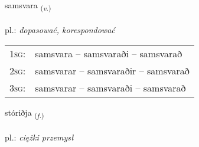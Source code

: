 \documentclass[frontgrid, backgrid]{flacards}\usepackage[]{graphicx}\usepackage[]{xcolor}
\begin{document}
\renewcommand{\flhead}{\vskip5pt \fboxsep=0pt {\small\bfseries\footnotesize Sagnorð | czasownik}}
\renewcommand{\fcfoot}{\vskip5pt \fboxsep=0pt \hspace{2pt}{\small\bfseries\footnotesize 3K}}

\renewcommand{\blhead}{\vskip5pt {\small\bfseries\footnotesize Sagnorð | czasownik }}
\renewcommand{\bcfoot}{\vskip5pt \hspace{2pt}{\small\bfseries\footnotesize 3K}}


{samsvara \small{\textsubscript{(\textit{v.})}} \\[1ex] %
\textphonetic{[samsvara]} \\
pl.: \emph{dopasować, korespondować} \\  [2ex]
\renewcommand*{\arraystretch}{0.8}
\begin{tabular}{p{1cm}l}
\textsc{1sg}: & samsvara -- samsvaraði -- samsvarað \\ 
\textsc{2sg}: & samsvarar -- samsvaraðir -- samsvarað \\ 
\textsc{3sg}: & samsvarar -- samsvaraði -- samsvarað \\ 
\end{tabular}
}

\renewcommand{\flhead}{\vskip5pt \fboxsep=0pt {\small\bfseries\footnotesize Nafnorð | rzeczownik}}
\renewcommand{\fcfoot}{\vskip5pt \fboxsep=0pt \hspace{2pt}{\small\bfseries\footnotesize 3K}}

\renewcommand{\blhead}{\vskip5pt {\small\bfseries\footnotesize Nafnorð | rzeczownik }}
\renewcommand{\bcfoot}{\vskip5pt \hspace{2pt}{\small\bfseries\footnotesize 3K}}


{stóriðja \small{\textsubscript{(\textit{f.})}} \\[1ex] %
\textphonetic{[stouːrɪðja]} \\
pl.: \emph{ciężki przemysł} \\  [2ex]
\renewcommand*{\arraystretch}{0.8}
}
\end{document}
